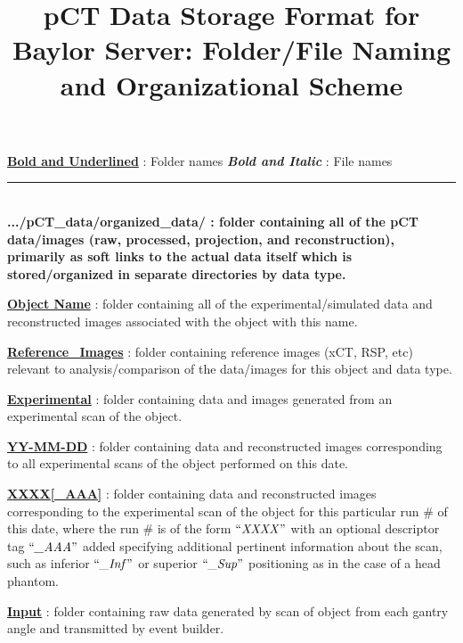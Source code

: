 \documentclass[landscape]{article}
\title{\vspace{-4ex}pCT Data Storage Format for Baylor Server: Folder/File Naming and Organizational Scheme}
\date{\vspace{-5ex}}
\begin{document}
\maketitle
\flushleft\ul{\textbf{Bold and Underlined}} : Folder names
\flushleft\textbf{\textit{Bold and Italic}} : File names
\vspace{0.5cm}
\rule{\textwidth}{1pt}
{\\\textbf{{.../pCT\_data/organized\_data/ :} folder containing all of the pCT data/images (raw, processed, projection, and reconstruction), primarily as soft links to the actual data itself which is stored/organized in separate directories by data type.}}
\begin{myEnumerate}[labelindent=0pt, leftmargin=*]
    \item \ul{\textbf{Object Name}} : folder containing all of the experimental/simulated data and reconstructed images associated with the object with this name.
    \begin{myEnumerate}[labelindent=1pt, leftmargin=*]
        \item \ul{\textbf{Reference\_Images}} : folder containing reference images (xCT, RSP, etc) relevant to analysis/comparison of the data/images for this object and data type.
        \item \ul{\textbf{Experimental}} : folder containing data and images generated from an experimental scan of the object.
        \begin{myEnumerate}[labelindent=1pt, leftmargin=*]
            \item \ul{\textbf{YY-MM-DD}} : folder containing data and reconstructed images corresponding to all experimental scans of the object performed on this date.
            \begin{myEnumerate}[labelindent=1pt, leftmargin=*]
                \item \ul{\textbf{XXXX[\_AAA]}} : folder containing data and reconstructed images corresponding to the experimental scan of the object for this particular run \# of this date, where the run \# is of the form $\textrm{``\textit{XXXX}''}$ with an optional descriptor tag $\textrm{``\textit{\_AAA}''}$ added specifying additional pertinent information about the scan, such as inferior $\textrm{``\textit{\_Inf}''}$ or superior $\textrm{``\textit{\_Sup}''}$ positioning as in the case of a head phantom.
                \begin{myEnumerate}[labelindent=1pt, leftmargin=*]
                    \item \ul{\textbf{Input}} : folder containing raw data generated by scan of object from each gantry angle and transmitted by event builder.

\end{myEnumerate}
\end{myEnumerate}
\end{myEnumerate}
\end{myEnumerate}
\end{myEnumerate}
\end{document}
